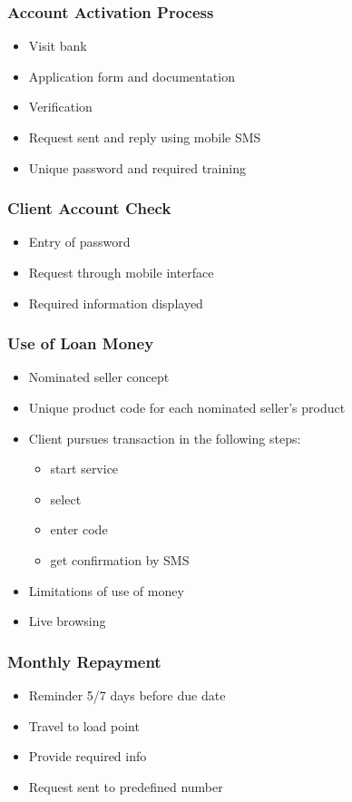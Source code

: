 \documentclass{beamer}
\begin{document}
\begin{frame}
\frametitle{Account Activation Process}
\begin{itemize}
\item Visit bank
\item Application form and documentation
\item Verification
\item Request sent and reply using mobile SMS
\item Unique password and required training
\end{itemize}
\end{frame}

\begin{frame}
\frametitle{Client Account Check}
\begin{itemize}
\item Entry of password
\item Request through mobile interface
\item Required information displayed
\end{itemize}
\end{frame}

\begin{frame}
\frametitle{Use of Loan Money}
\begin{itemize}
\item Nominated seller concept
\item Unique product code for each nominated seller's product
\item Client pursues transaction in the following steps:
\begin{itemize}
\item start service
\item select
\item enter code
\item get confirmation by SMS
\end{itemize}
\item Limitations of use of money
\item Live browsing
\end{itemize}
\end{frame}

\begin{frame}
\frametitle{Monthly Repayment}
\begin{itemize}
\item Reminder 5/7 days before due date
\item Travel to load point
\item Provide required info
\item Request sent to predefined number
\end{itemize}
\end{frame}
\end{document}
